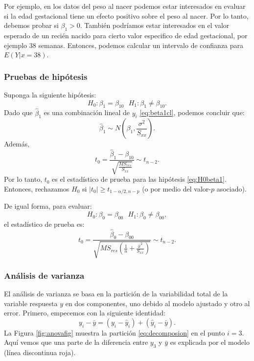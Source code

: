 \documentclass[
]{article}
\begin{document}
Por ejemplo, en los datos del peso al nacer podemos estar interesados en evaluar si la edad gestacional tiene un efecto positivo sobre el peso al nacer. Por lo tanto, debemos probar si \(\beta_{1} > 0\). También podríamos estar interesados en el valor esperado de un recién nacido para cierto valor especifico de edad gestacional, por ejemplo 38 semanas. Entonces, podemos calcular un intervalo de confianza para \(E(Y|x=38)\).

\hypertarget{pruebas-de-hipuxf3tesis}{%
\subsubsection{Pruebas de hipótesis}\label{pruebas-de-hipuxf3tesis}}

Suponga la siguiente hipótesis:
\begin{equation}
H_{0}: \beta_{1} = \beta_{10} \mbox{  } H_{1}: \beta_{1} \neq \beta_{10}.
\label{eq:H0beta1}
\end{equation}
Dado que \(\widehat{\beta}_{1}\) es una combinación lineal de \(y_{i}\) \eqref{eq:beta1cl}, podemos concluir que:
\[
\widehat{\beta}_{1} \sim N\left(\beta_{1}, \frac{\sigma^{2}}{S_{xx}}\right).
\]
Además,
\begin{equation}
t_{0} = \frac{\widehat{\beta}_{1}-\beta_{10}}{\sqrt{\frac{MS_{res}}{S_{xx}}}}\sim t_{n-2}.
\label{eq:distB1}
\end{equation}
Por lo tanto, \(t_{0}\) es el estadístico de prueba para las hipótesis \eqref{eq:H0beta1}. Entonces, rechazamos \(H_{0}\) si \(|t_{0}| \ge t_{1-\alpha/2,n-p}\) (o por medio del valor-\(p\) asociado).

De igual forma, para evaluar:
\[
H_{0}: \beta_{0} = \beta_{00} \mbox{  } H_{1}: \beta_{0} \neq \beta_{00},
\]
el estadístico de prueba es:
\begin{equation}
t_{0} = \frac{\widehat{\beta}_{0}-\beta_{00}}{\sqrt{MS_{res}\left(\frac{1}{n}+\frac{\bar{x}^{2}}{S_{xx}} \right)}} \sim t_{n-2}.
 \label{eq:distB0}
\end{equation}

\hypertarget{anuxe1lisis-de-varianza}{%
\subsubsection{Análisis de varianza}\label{anuxe1lisis-de-varianza}}

El análisis de varianza se basa en la partición de la variabilidad total de la variable respuesta \(y\) en dos componentes, uno debido al modelo ajustado y otro al error. Primero, empecemos con la siguiente identidad:
\begin{equation}
y_{i} - \bar{y} = (y_{i} - \widehat{y}_{i}) + (\widehat{y}_{i} - \bar{y}).
\label{eq:decomposion}
\end{equation}
La Figura \ref{fig:anovafig} muestra la partición \eqref{eq:decomposion} en el punto \(i=3\). Aquí vemos que una parte de la diferencia entre \(y_{3}\) y \(\bar{y}\) es explicada por el modelo (línea discontinua roja).
\end{document}
